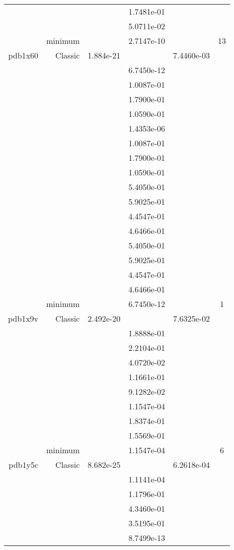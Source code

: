 \begin{xltabular}{\textwidth}{r|rS[table-format=1.3e+2]S[table-format=1.4e+2]S[table-format=1.4e+2]S[table-format=-1.5]}
&  &  & 1.7481e-01 & & \\
&  &  & 5.0711e-02 & & \\
& minimum &  & 2.7147e-10 & & 13 \\  \addlinespace
pdb1x60 & Classic & 1.884e-21 &  & 7.4460e-03 & \\
&  &  & 6.7450e-12 & & \\
&  &  & 1.0087e-01 & & \\
&  &  & 1.7900e-01 & & \\
&  &  & 1.0590e-01 & & \\
&  &  & 1.4353e-06 & & \\
&  &  & 1.0087e-01 & & \\
&  &  & 1.7900e-01 & & \\
&  &  & 1.0590e-01 & & \\
&  &  & 5.4050e-01 & & \\
&  &  & 5.9025e-01 & & \\
&  &  & 4.4547e-01 & & \\
&  &  & 4.6466e-01 & & \\
&  &  & 5.4050e-01 & & \\
&  &  & 5.9025e-01 & & \\
&  &  & 4.4547e-01 & & \\
&  &  & 4.6466e-01 & & \\
& minimum &  & 6.7450e-12 & & 1 \\  \addlinespace
pdb1x9v & Classic & 2.492e-20 &  & 7.6325e-02 & \\
&  &  & 1.8888e-01 & & \\
&  &  & 2.2104e-01 & & \\
&  &  & 4.0720e-02 & & \\
&  &  & 1.1661e-01 & & \\
&  &  & 9.1282e-02 & & \\
&  &  & 1.1547e-04 & & \\
&  &  & 1.8374e-01 & & \\
&  &  & 1.5569e-01 & & \\
& minimum &  & 1.1547e-04 & & 6 \\  \addlinespace
pdb1y5c & Classic & 8.682e-25 &  & 6.2618e-04 & \\
&  &  & 1.1141e-04 & & \\
&  &  & 1.1796e-01 & & \\
&  &  & 4.3460e-01 & & \\
&  &  & 3.5195e-01 & & \\
&  &  & 8.7499e-13 & & \\

\end{xltabular}

